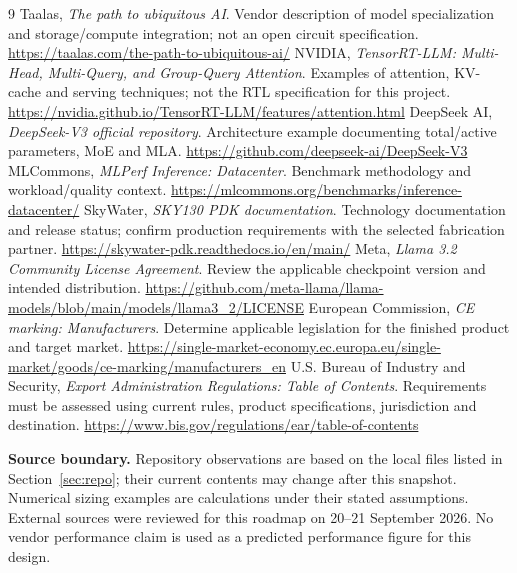 \documentclass[11pt,a4paper]{article}
\begin{document}
\clearpage
{}
\begin{thebibliography}{9}
 Taalas, \emph{The path to ubiquitous AI}. Vendor description of
model specialization and storage/compute integration; not an open circuit specification.
\url{https://taalas.com/the-path-to-ubiquitous-ai/}
 NVIDIA, \emph{TensorRT-LLM: Multi-Head, Multi-Query, and
Group-Query Attention}. Examples of attention, KV-cache and serving techniques;
not the RTL specification for this project.
\url{https://nvidia.github.io/TensorRT-LLM/features/attention.html}
 DeepSeek AI, \emph{DeepSeek-V3 official repository}.
Architecture example documenting total/active parameters, MoE and MLA.
\url{https://github.com/deepseek-ai/DeepSeek-V3}
 MLCommons, \emph{MLPerf Inference: Datacenter}.
Benchmark methodology and workload/quality context.
\url{https://mlcommons.org/benchmarks/inference-datacenter/}
 SkyWater, \emph{SKY130 PDK documentation}.
Technology documentation and release status; confirm production requirements
with the selected fabrication partner.
\url{https://skywater-pdk.readthedocs.io/en/main/}
 Meta, \emph{Llama 3.2 Community License Agreement}.
Review the applicable checkpoint version and intended distribution.
\url{https://github.com/meta-llama/llama-models/blob/main/models/llama3_2/LICENSE}
 European Commission, \emph{CE marking: Manufacturers}.
Determine applicable legislation for the finished product and target market.
\url{https://single-market-economy.ec.europa.eu/single-market/goods/ce-marking/manufacturers_en}
 U.S. Bureau of Industry and Security, \emph{Export Administration
Regulations: Table of Contents}. Requirements must be assessed using current
rules, product specifications, jurisdiction and destination.
\url{https://www.bis.gov/regulations/ear/table-of-contents}
\end{thebibliography}
\vspace{4pt}
\textbf{Source boundary.} Repository observations are based on the local files
listed in Section~\ref{sec:repo}; their current contents may change after this
snapshot. Numerical sizing examples are calculations under their stated assumptions.
External sources were reviewed for this roadmap on 20--21 September 2026. No
vendor performance claim is used as a predicted performance figure for this design.
\end{document}

